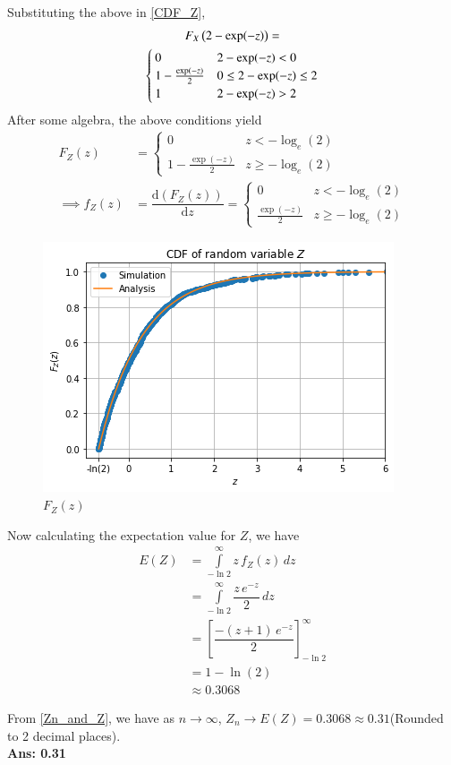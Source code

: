 \documentclass[journal,12pt,twocolumn]{IEEEtran}
\begin{document}
%
Substituting the above in \eqref{CDF_Z},
%
\begin{multline}
F_X\left(2- \exp(-z)\right) =
\\
\begin{cases}
0 &  2- \exp(-z) < 0 \\
1- \frac{\exp(-z)}{2} & 0 \leq 2- \exp(-z) \leq 2 \\
1 & 2- \exp(-z) > 2
\end{cases}
\end{multline}
After some algebra, the above conditions yield
\begin{align}
F_Z(z) &= 
\begin{cases}
0 & z < -\log_e (2) \\
1- \frac{\exp(-z)}{2} & z \geq -\log_e (2)
\end{cases}
\label{CDF_Z_Final}\\
\implies f_Z(z)&=\dfrac{\text{d}(F_Z(z))}{\text{d}z}   
=\begin{cases}
0 & z < -\log_e (2) \\
\frac{\exp(-z)}{2} & z \geq -\log_e (2)
\end{cases}
\label{PDF_Z_Final}
\end{align}
\begin{figure}[H]
    \centering
      \includegraphics[width=\columnwidth]{Figures/CDF_Z.png}
     \caption{$F_Z(z)$}
\end{figure}
Now calculating the expectation value for $Z$, we have
\begin{align}
    E(Z)&=\int\limits_{-\ln{2}}^{\infty}z\,f_Z(z)\,dz\\
    &=\int\limits_{-\ln{2}}^{\infty}\dfrac{z\,e^{-z}}{2}\,dz\\
    &=\left[ \dfrac{-(z+1)\,e^{-z}}{2} \right]_{-\ln{2}}^\infty\\
    &=1-\ln{(2)}\\
    &\approx0.3068
\end{align}
\par From \eqref{Zn_and_Z}, we have as $n \to \infty$, $Z_n \to E(Z)=0.3068\approx0.31$(Rounded to 2 decimal places).\\
\textbf{Ans: 0.31}
\end{document}
